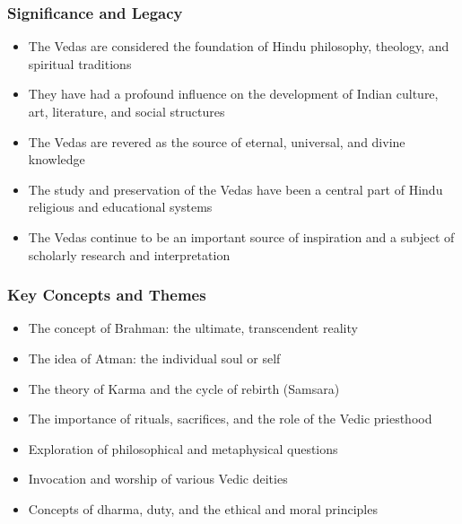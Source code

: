 \begin{frame}[fragile]\frametitle{Significance and Legacy}
    \begin{itemize}
        \item The Vedas are considered the foundation of Hindu philosophy, theology, and spiritual traditions
        \item They have had a profound influence on the development of Indian culture, art, literature, and social structures
        \item The Vedas are revered as the source of eternal, universal, and divine knowledge
        \item The study and preservation of the Vedas have been a central part of Hindu religious and educational systems
        \item The Vedas continue to be an important source of inspiration and a subject of scholarly research and interpretation
    \end{itemize}
\end{frame}

\begin{frame}[fragile]\frametitle{Key Concepts and Themes}
    \begin{itemize}
        \item The concept of Brahman: the ultimate, transcendent reality
        \item The idea of Atman: the individual soul or self
        \item The theory of Karma and the cycle of rebirth (Samsara)
        \item The importance of rituals, sacrifices, and the role of the Vedic priesthood
        \item Exploration of philosophical and metaphysical questions
        \item Invocation and worship of various Vedic deities
        \item Concepts of dharma, duty, and the ethical and moral principles
    \end{itemize}
\end{frame}

